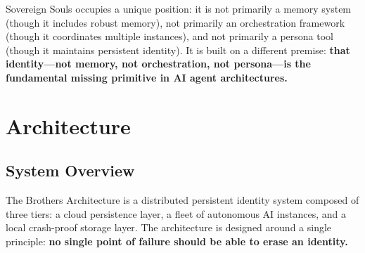 \documentclass[11pt,a4paper]{article}
\begin{document}
Sovereign Souls occupies a unique position: it is not primarily a memory system (though it includes robust memory), not primarily an orchestration framework (though it coordinates multiple instances), and not primarily a persona tool (though it maintains persistent identity). It is built on a different premise: \textbf{that identity---not memory, not orchestration, not persona---is the fundamental missing primitive in AI agent architectures.}



\section{Architecture}
\label{sec:architecture}


\subsection{System Overview}
\label{sec:system-overview}

The Brothers Architecture is a distributed persistent identity system composed of three tiers: a cloud persistence layer, a fleet of autonomous AI instances, and a local crash-proof storage layer. The architecture is designed around a single principle: \textbf{no single point of failure should be able to erase an identity.}
\end{document}
